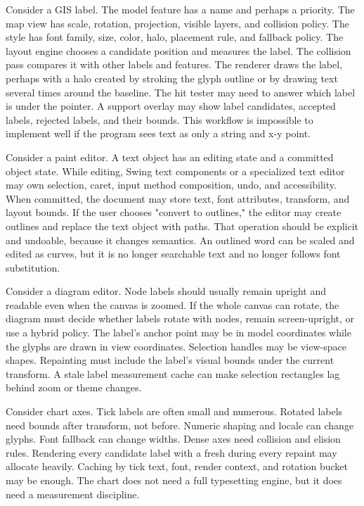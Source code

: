 Consider a GIS label. The model feature has a name and perhaps a priority. The map view has scale, rotation, projection, visible layers, and collision policy. The style has font family, size, color, halo, placement rule, and fallback policy. The layout engine chooses a candidate position and measures the label. The collision pass compares it with other labels and features. The renderer draws the label, perhaps with a halo created by stroking the glyph outline or by drawing text several times around the baseline. The hit tester may need to answer which label is under the pointer. A support overlay may show label candidates, accepted labels, rejected labels, and their bounds. This workflow is impossible to implement well if the program sees text as only a string and x-y point.

Consider a paint editor. A text object has an editing state and a committed object state. While editing, Swing text components or a specialized text editor may own selection, caret, input method composition, undo, and accessibility. When committed, the document may store text, font attributes, transform, and layout bounds. If the user chooses "convert to outlines," the editor may create  outlines and replace the text object with paths. That operation should be explicit and undoable, because it changes semantics. An outlined word can be scaled and edited as curves, but it is no longer searchable text and no longer follows font substitution.

Consider a diagram editor. Node labels should usually remain upright and readable even when the canvas is zoomed. If the whole canvas can rotate, the diagram must decide whether labels rotate with nodes, remain screen-upright, or use a hybrid policy. The label's anchor point may be in model coordinates while the glyphs are drawn in view coordinates. Selection handles may be view-space shapes. Repainting must include the label's visual bounds under the current transform. A stale label measurement cache can make selection rectangles lag behind zoom or theme changes.

Consider chart axes. Tick labels are often small and numerous. Rotated labels need bounds after transform, not before. Numeric shaping and locale can change glyphs. Font fallback can change widths. Dense axes need collision and elision rules. Rendering every candidate label with a fresh  during every repaint may allocate heavily. Caching by tick text, font, render context, and rotation bucket may be enough. The chart does not need a full typesetting engine, but it does need a measurement discipline.

